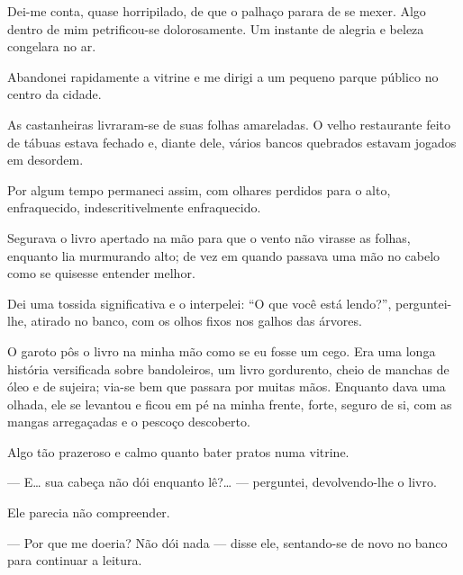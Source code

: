 Dei-me conta, quase horripilado, de que o palhaço parara de se mexer. Algo
dentro de mim petrificou-se dolorosamente. Um instante de alegria e beleza
congelara no ar.

Abandonei rapidamente a vitrine e me dirigi a um pequeno parque público no
centro da cidade.

As castanheiras livraram-se de suas folhas amareladas. O velho restaurante
feito de tábuas estava fechado e, diante dele, vários bancos quebrados
estavam jogados em desordem.


Por algum tempo permaneci assim, com olhares perdidos para o alto,
enfraquecido, indescritivelmente enfraquecido.


Segurava o livro apertado na mão para que o vento não virasse as folhas,
enquanto lia murmurando alto; de vez em quando passava uma mão no cabelo como
se quisesse entender melhor.

Dei uma tossida significativa e o interpelei: ``O que você está lendo?'',
perguntei-lhe, atirado no banco, com os olhos fixos nos galhos das árvores.

O garoto pôs o livro na minha mão como se eu fosse um cego. Era uma longa
história versificada sobre bandoleiros, um livro gordurento, cheio de manchas
de óleo e de sujeira; via-se bem que passara por muitas mãos. Enquanto dava
uma olhada, ele se levantou e ficou em pé na minha frente, forte, seguro de
si, com as mangas arregaçadas e o pescoço descoberto.

Algo tão prazeroso e calmo quanto bater pratos numa vitrine.

--- E\ldots{} sua cabeça não dói enquanto lê?\ldots{} --- perguntei,
    devolvendo-lhe o livro.

Ele parecia não compreender.

--- Por que me doeria? Não dói nada --- disse ele, sentando-se de novo no
    banco para continuar a leitura.


